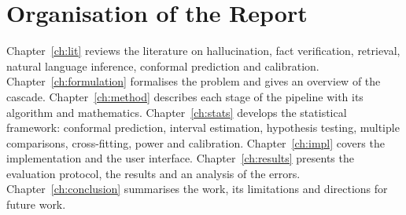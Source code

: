 \section{Organisation of the Report}

Chapter~\ref{ch:lit} reviews the literature on hallucination, fact verification, retrieval, natural language inference, conformal prediction and calibration. Chapter~\ref{ch:formulation} formalises the problem and gives an overview of the cascade. Chapter~\ref{ch:method} describes each stage of the pipeline with its algorithm and mathematics. Chapter~\ref{ch:stats} develops the statistical framework: conformal prediction, interval estimation, hypothesis testing, multiple comparisons, cross-fitting, power and calibration. Chapter~\ref{ch:impl} covers the implementation and the user interface. Chapter~\ref{ch:results} presents the evaluation protocol, the results and an analysis of the errors. Chapter~\ref{ch:conclusion} summarises the work, its limitations and directions for future work.
